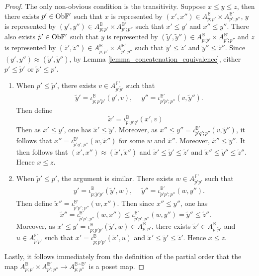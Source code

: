\documentclass[reqno, 10pt]{amsart}
\numberwithin{equation}{section}
\numberwithin{equation}{section}
\theoremstyle{definition}
\theoremstyle{remark}
\newcommand{\beqn}{\begin{equation*}}
\newcommand{\eeqn}{\end{equation*}}
\newcommand{\mb}{\mathbb}
\begin{document}
\begin{proof}
The only non-obvious condition is the transitivity. Suppose $x \leq y \leq z$, then there exists $p' \in {\rm Ob}{\mb F}'$ such that $x$ is represented by $(x', x'') \in A_{p; p'}^{{\mb B}} \times A_{p';p''}^{{\mb B}'}$, $y$ is represented by $(y', y'') \in A_{p; p'}^{\mb B}\times A_{p'; p''}^{{\mb B}'}$ such that $x' \leq y'$ and $x'' \leq y''$. There also exists $\tilde p' \in {\rm Ob}{\mb F}'$ such that $y$ is represented by $(\tilde y', \tilde y'') \in A_{p; \tilde p'}^{{\mb B}} \times A_{\tilde p'; p''}^{{\mb B}'}$ and $z$ is represented by $(\tilde z', \tilde z'') \in A_{p; \tilde p'}^{{\mb B}} \times A_{\tilde p'; p''}^{{\mb B}'}$ such that $\tilde y' \leq \tilde z'$ and $\tilde y'' \leq \tilde z''$. Since $(y', y'') \approx (\tilde y', \tilde y'')$, by Lemma \ref{lemma_concatenation_equivalence}, either $p' \leq \tilde p'$ or $\tilde p' \leq p'$. 

\begin{enumerate}

\item When $p' \leq \tilde p'$,  there exists $v \in A_{p'\tilde p'}^{{\mb F}'}$ such that 
\begin{align*}
&\ \tilde y' = \iota_{p; p'\tilde p'}^{{\mb B}}( y', v),\ &\  y'' = \iota_{p'\tilde p'; p''}^{{\mb B}'}(v, \tilde y'').
\end{align*}
Then define
\beqn
\tilde x' = \iota_{p; p'q'}^{{\mb B}}(x', v)
\eeqn
Then as $x' \leq y'$, one has $\tilde x' \leq \tilde y'$. Moreover, as $x'' \leq y'' = \iota_{p'q'; p''}^{{\mb B}'}(v, \tilde y'')$, it follows that $x'' = \iota_{p'q'; p''}^{{\mb B}'}(w, \tilde x'')$ for some $w$ and $\tilde x''$. Moreover, $\tilde x'' \leq \tilde y''$. It then follows that $(x', x'') \approx (\tilde x', \tilde x'')$ and $\tilde x' \leq \tilde y' \leq \tilde z'$ and $\tilde x'' \leq \tilde y'' \leq \tilde z''$. Hence $x \leq z$. 

\item When $\tilde p' \leq p'$, the argument is similar. There exists $w \in A_{\tilde p' p'}^{{\mb F}'}$ such that 
\begin{align*}
    &\ y' = \iota_{p; \tilde p' p'}^{\mb B}(\tilde y', w),\ &\ \tilde y'' = \iota_{\tilde p'p'; p''}^{{\mb B}'}(w, y'').
\end{align*}
Then define $\tilde x'' = \iota_{\tilde p'p'; p''}^{{\mb B}'}(w, x'')$. Then since $x'' \leq y''$, one has
\beqn
\tilde x'' = \iota_{\tilde p'p'; p''}^{{\mb B}'}(w, x'') \leq \iota_{\tilde p'p'; p''}^{{\mb B}'}(w, y'') = \tilde y'' \leq \tilde z''.
\eeqn
Moreover, as $x' \leq y' = \iota_{p; \tilde p'p'}^{\mb B}(\tilde y', w) \in A_{p; p'}^{\mb B}$, there exists $\tilde x' \in A_{p; \tilde p'}^{\mb B}$ and $u \in A_{\tilde p'p'}^{{\mb F}'}$ such that $x' =\iota_{p; \tilde p'p'}^{\mb B}(\tilde x', u)$ and $\tilde x' \leq \tilde y' \leq \tilde z'$. Hence $x \leq z$. 
\end{enumerate}
Lastly, it follows immediately from the definition of the partial order that the map $A_{p; p'}^{\mb B} \times A_{p'; p''}^{{\mb B}'} \to A_{p; p''}^{{\mb B} \circ {\mb B}'}$ is a poset map.
\end{proof}
\end{document}
